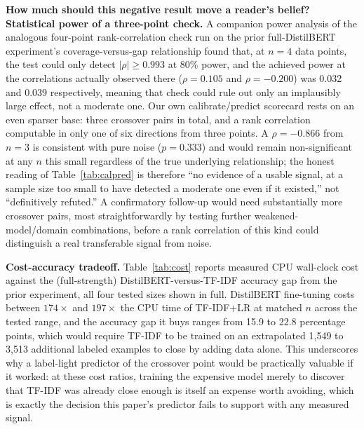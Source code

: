 \documentclass[11pt,letterpaper]{article}
\begin{document}
\textbf{How much should this negative result move a reader's belief? Statistical power of a three-point check.} A companion power analysis of the analogous four-point rank-correlation check run on the prior full-DistilBERT experiment's coverage-versus-gap relationship found that, at $n{=}4$ data points, the test could only detect $|\rho| \geq 0.993$ at 80\% power, and the achieved power at the correlations actually observed there ($\rho{=}0.105$ and $\rho{=}-0.200$) was 0.032 and 0.039 respectively, meaning that check could rule out only an implausibly large effect, not a moderate one. Our own calibrate/predict scorecard rests on an even sparser base: three crossover pairs in total, and a rank correlation computable in only one of six directions from three points. A $\rho{=}-0.866$ from $n{=}3$ is consistent with pure noise ($p{=}0.333$) and would remain non-significant at any $n$ this small regardless of the true underlying relationship; the honest reading of Table~\ref{tab:calpred} is therefore ``no evidence of a usable signal, at a sample size too small to have detected a moderate one even if it existed,'' not ``definitively refuted.'' A confirmatory follow-up would need substantially more crossover pairs, most straightforwardly by testing further weakened-model/domain combinations, before a rank correlation of this kind could distinguish a real transferable signal from noise.

\textbf{Cost-accuracy tradeoff.} Table~\ref{tab:cost} reports measured CPU wall-clock cost against the (full-strength) DistilBERT-versus-TF-IDF accuracy gap from the prior experiment, all four tested sizes shown in full. DistilBERT fine-tuning costs between $174\times$ and $197\times$ the CPU time of TF-IDF+LR at matched $n$ across the tested range, and the accuracy gap it buys ranges from 15.9 to 22.8 percentage points, which would require TF-IDF to be trained on an extrapolated 1{,}549 to 3{,}513 additional labeled examples to close by adding data alone. This underscores why a label-light predictor of the crossover point would be practically valuable if it worked: at these cost ratios, training the expensive model merely to discover that TF-IDF was already close enough is itself an expense worth avoiding, which is exactly the decision this paper's predictor fails to support with any measured signal.
\end{document}
